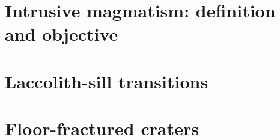 \documentclass[a4paper,11pt,twoside]{ThesisStyle}
\begin{document}


\dominitoc


\cleardoublepage



\cleardoublepage

\tableofcontents

\mainmatter

\setcounter{chapter}{-1}
\pagestyle{empty}


\part{Intrusive magmatism: definition and objective}
\pagestyle{fancy}




\part{Laccolith-sill transitions}




\part{Floor-fractured craters}




% 



% 
% 

% 



\end{document}
